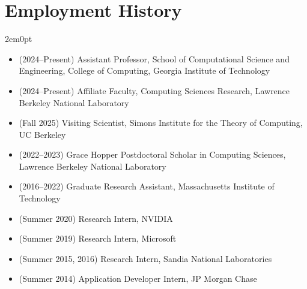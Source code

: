 \section{Employment History}
\begin{adjustwidth}{2em}{0pt}

\begin{itemize}
    \item (2024--Present) Assistant Professor, School of Computational Science
    and Engineering, College of Computing, Georgia Institute of Technology
        \item (2024--Present) Affiliate Faculty, Computing Sciences Research,
        Lawrence Berkeley National Laboratory
    \item (Fall 2025) Visiting Scientist, Simons Institute for the Theory of Computing, UC Berkeley
    \item (2022--2023) Grace Hopper Postdoctoral Scholar in Computing Sciences,
    Lawrence Berkeley National Laboratory
    \item (2016--2022) Graduate Research Assistant, Massachusetts Institute of Technology
\item (Summer 2020) Research Intern, NVIDIA
\item (Summer 2019) Research Intern, Microsoft
\item (Summer 2015, 2016) Research Intern, Sandia National Laboratories
\item (Summer 2014) Application Developer Intern, JP Morgan Chase
\end{itemize}

\end{adjustwidth}

